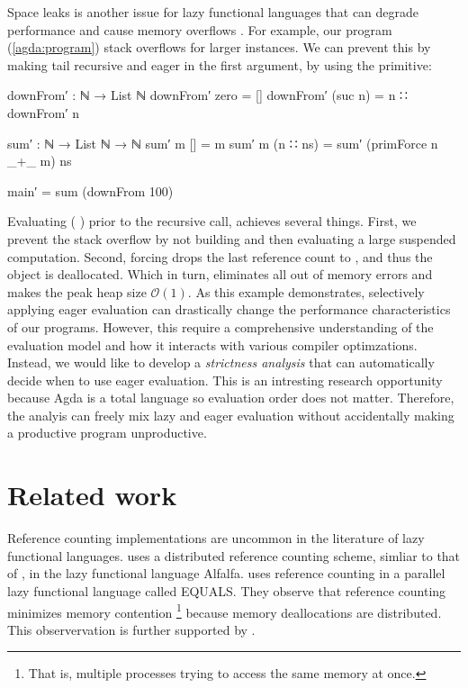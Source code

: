 \documentclass[9pt, twocolumn]{article}
\renewcommand{\AgdaUnderscore}{\texttt{\_}}
\newcommand{\refp}[1]{(\ref{#1})}
\begin{document}
Space leaks is another issue for lazy functional languages that can degrade performance and cause memory overflows \citep{jones1987}.
For example, our program \refp{agda:program} stack overflows for larger instances.
We can prevent this by making  tail recursive and eager in the first argument, by using the \mbox{} primitive:

\begin{code}[number=agda:final-program]
downFrom′ : ℕ → List ℕ
downFrom′ zero = []
downFrom′ (suc n) = n ∷ downFrom′ n 

sum′ : ℕ → List ℕ → ℕ
sum′ m [] = m
sum′ m (n ∷ ns) = 
  sum′ (primForce n _+_ m) ns

main′ = sum (downFrom 100) 
\end{code}
Evaluating (  \AgdaFunction{\AgdaUnderscore+\AgdaUnderscore} ) prior to the recursive call, achieves several things.
First, we prevent the stack overflow by not building and then evaluating a large suspended computation.
Second, forcing \AgdaFunction{\AgdaUnderscore+\AgdaUnderscore} drops the last reference count to , and thus the object is deallocated. 
Which in turn, eliminates all out of memory errors and makes the peak heap size $\mathcal{O}(1)$.
As this example demonstrates, selectively applying eager evaluation can drastically change the performance characteristics of our programs.
However, this require a comprehensive understanding of the evaluation model and how it interacts with various compiler optimzations.
Instead, we would like to develop a \emph{strictness analysis} \citep{mycroft1980} that can automatically decide when to use eager evaluation.
This is an intresting research opportunity because Agda is a total language so evaluation order does not matter.
Therefore, the analyis can freely mix lazy and eager evaluation without accidentally making a productive program unproductive.

\section{Related work}
Reference counting implementations are uncommon in the literature of lazy functional languages.
\citet{goldberg1988} uses a distributed reference counting scheme, simliar to that of \citet{lermen1986}, in the lazy functional language Alfalfa.
\citet{kaser1992} uses reference counting in a parallel lazy functional language called EQUALS. 
They observe that reference counting minimizes memory contention%
\footnote{That is, multiple processes trying to access the same memory at once.} %
because memory deallocations are distributed. 
This observervation is further supported by \citet{jones1987, jones1996}.
\end{document}
